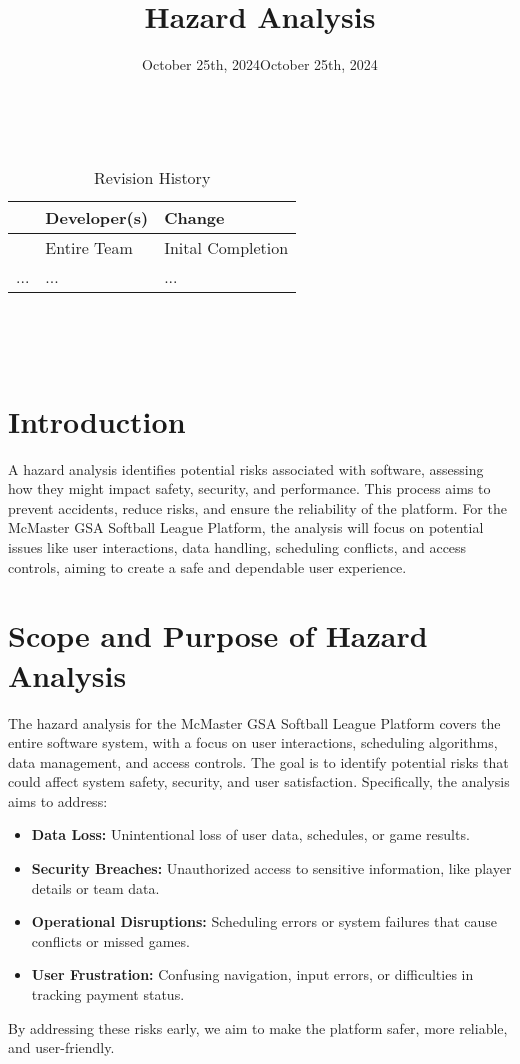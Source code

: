 \documentclass{article}
\title{Hazard Analysis\\\progname}
\author{\authname}
\date{October 25th, 2024}
\begin{document}
\maketitle
\thispagestyle{empty}

~\newpage


\begin{table}[hp]
\caption{Revision History} \label{TblRevisionHistory}
\begin{tabularx}{\textwidth}{llX}
\toprule
\textbf{} & \textbf{Developer(s)} & \textbf{Change}\\
\midrule
\date{October 25th, 2024} & Entire Team & Inital Completion\\
... & ... & ...\\
\bottomrule
\end{tabularx}
\end{table}

~\newpage

\tableofcontents

~\newpage


\section{Introduction}
A hazard analysis identifies potential risks associated with software, assessing how they might impact safety, security, and performance. This process aims to prevent accidents, reduce risks, and ensure the reliability of the platform. For the McMaster GSA Softball League Platform, the analysis will focus on potential issues like user interactions, data handling, scheduling conflicts, and access controls, aiming to create a safe and dependable user experience.

\section{Scope and Purpose of Hazard Analysis}
The hazard analysis for the McMaster GSA Softball League Platform covers the entire software system, with a focus on user interactions, scheduling algorithms, data management, and access controls. The goal is to identify potential risks that could affect system safety, security, and user satisfaction. Specifically, the analysis aims to address:\begin{itemize}
    \item \textbf{Data Loss:} Unintentional loss of user data, schedules, or game results.
    \item \textbf{Security Breaches:} Unauthorized access to sensitive information, like player details or team data.
    \item \textbf{Operational Disruptions:} Scheduling errors or system failures that cause conflicts or missed games.
    \item \textbf{User Frustration:} Confusing navigation, input errors, or difficulties in tracking payment status.
\end{itemize}
By addressing these risks early, we aim to make the platform safer, more reliable, and user-friendly.
\end{document}
